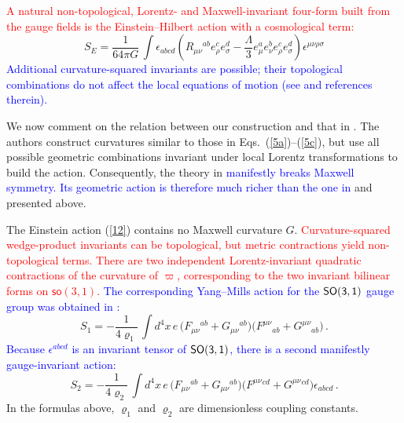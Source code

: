\documentclass [prd,reprint,eqsecnum,nofootinbib]  {revtex4-1}
\newcommand{\lang}[1]{\textcolor{blue}{#1}}
\newcommand{\science}[1]{\textcolor{red}{#1}}
\begin{document}
\science{A natural non-topological, Lorentz- and Maxwell-invariant
four-form built from the gauge fields is the Einstein--Hilbert action
with a cosmological term:}
\begin{equation}
S_{E} =\frac1{64\pi G}\,
\int\epsilon_{abcd}\left(R_{\mu\nu}{}^{ab}e_{\rho}^{c}e_{\sigma}^{d}
-\frac{\Lambda}{3}e_{\mu}^{a}e_{\nu}^{b}e_{\rho}^{ c}e_{\sigma}^{
d}\right)\epsilon^{\mu\nu\rho\sigma}\label{12}
\end{equation}
\lang{Additional curvature-squared invariants are possible; their
topological combinations do not affect the local equations of motion
(see \cite{Durka:2011nf} and references therein).}

We now comment on the relation between our construction and that in
\cite{deAzcarraga:2010sw}. The authors construct curvatures similar
to those in Eqs.~(\ref{5a})--(\ref{5c}), but use all possible
geometric combinations invariant under local Lorentz transformations
to build the action. Consequently, the theory in
\cite{deAzcarraga:2010sw} \lang{manifestly breaks Maxwell symmetry.
Its geometric action is therefore much richer than the one in}
\cite{Durka:2011nf} and presented above.

The Einstein action (\ref{12}) contains no Maxwell curvature $G$.
\science{Curvature-squared wedge-product invariants can be
topological, but metric contractions yield non-topological terms.
There are two independent Lorentz-invariant quadratic contractions
of the curvature of $\varpi$, corresponding to the two invariant
bilinear forms on $\mathsf{so}(3,1)$.}
\lang{The corresponding Yang--Mills action for the $\sf{SO(3,1)}$
gauge group was obtained in \cite{Soroka:2011tc,Durka:2011nf}:}
\begin{equation}\label{13}
 S_{1}= -  \frac1{4\varrho_1}\,\int d^4x\, e\, \big( F_{\mu\nu}{}^{ab} + G_{\mu\nu}{}^{ab}\big) \big( F^{\mu\nu}{}_{ab} +
    G^{\mu\nu}{}_{ab}\big)\, .
\end{equation}
\lang{Because $\epsilon^{abcd}$ is an invariant tensor of
$\sf{SO(3,1)}$, there is a second manifestly gauge-invariant action:}
\begin{equation}\label{13a}
 S_{2}= -  \frac1{4\varrho_2}\,\int d^4x\, e\, \big( F_{\mu\nu}{}^{ab} + G_{\mu\nu}{}^{ab}\big) \big( F^{\mu\nu}{}^{cd} +
    G^{\mu\nu}{}^{cd}\big) \epsilon_{abcd}\, .
\end{equation}
In the formulas above, $\varrho_1$ and $\varrho_2$ are
dimensionless coupling constants.
\end{document}
